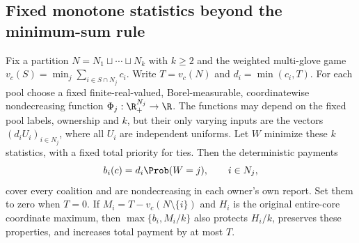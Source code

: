 \subsection{Fixed monotone statistics beyond the minimum-sum rule}
\begin{lemma}\label{hist:threshold-class}
Fix a partition $N=N_1\sqcup\cdots\sqcup N_k$ with $k\ge2$ and the
weighted multi-glove game
$v_c(S)=\min_j\sum_{i\in S\cap N_j}c_i$. Write $T=v_c(N)$ and
$d_i=\min(c_i,T)$. For each pool choose a fixed finite-real-valued,
Borel-measurable, coordinatewise nondecreasing function
$\Phi_j:\R_+^{N_j}\to\R$. The functions may depend on the fixed pool
labels, ownership and $k$, but their only varying inputs are the vectors
$(d_iU_i)_{i\in N_j}$, where all $U_i$ are independent uniforms.
Let $W$ minimize these $k$ statistics, with a fixed total priority for ties.
Then the deterministic payments
\[
 b_i(c)=d_i\Prob(W=j),\qquad i\in N_j,
\]
cover every coalition and are nondecreasing in each owner's own report.
Set them to zero when $T=0$. If $M_i=T-v_c(N\setminus\{i\})$ and
$H_i$ is the original entire-core coordinate maximum, then
$\max\{b_i,M_i/k\}$ also protects $H_i/k$, preserves these properties,
and increases total payment by at most $T$.
\end{lemma}
